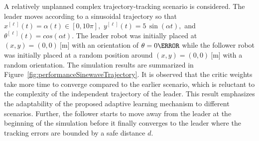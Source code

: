 \documentclass[letterpaper]{article} %
\begin{document}
A relatively unplanned complex trajectory-tracking scenario is considered. The leader moves according to a sinusoidal trajectory so that %
%
$x^{[\ell]}(t) = \alpha (t) \in [0,10\pi],$ %
$y^{[\ell]}(t) = 5 \,\sin(\alpha t),$ and %
$\theta^{[\ell]}(t) = cos(\alpha t).$  %
%
The leader robot  was initially placed at $(x,y) = (0, 0)~\si{[\meter]}$ with an orientation of $\theta = 0 \degree$ while the follower robot was initially placed at a random position around $(x,y) = (0, 0)~\si{[\meter]}$ with a random orientation. The simulation results are summarized in Figure~\ref{fig:performanceSinewaveTrajectory}. It is observed that the critic weights take more time to converge compared to the earlier scenario,  which is reluctant to the complexity of the independent trajectory of the leader. This result emphasizes the adaptability of the proposed adaptive learning mechanism to different scenarios. Further, the follower starts to move away from the leader at the beginning of the simulation before it finally converges to the leader where the tracking errors are bounded by a safe distance $d.$ %
%
\begin{figure*}[htbp]%
    \centering
    \subfigure[][]{%
        \label{fig:trajectorySinewave}%
      }
    \subfigure[][]{%
        \label{fig:stateErrorSinewave}%
      }
    \\
    \subfigure[][]{%
        \label{fig:controlInputSinewave}%
      }
    \subfigure[][]{%
        \label{fig:weightSinewaveDistance}%
      }
    \caption[Leader-follower performance for nonlinear trajectory.]{Second scenario (sinusoidal trajectory): 
         leader-follower trajectories,~ state tracking errors,~ linear speed and steering angle of the follower, and     critic weights.}%
    \label{fig:performanceSinewaveTrajectory}%
\end{figure*}
%
\end{document}
